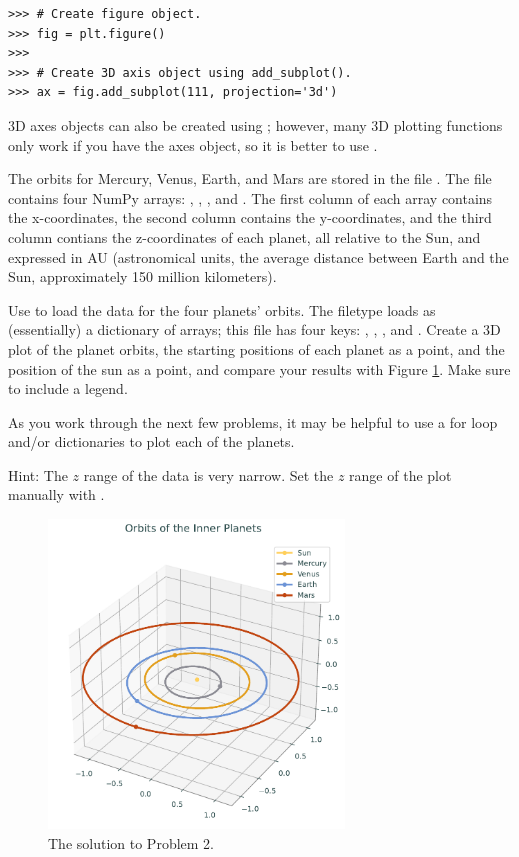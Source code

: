 \begin{lstlisting}
>>> # Create figure object.
>>> fig = plt.figure()
>>>
>>> # Create 3D axis object using add_subplot().
>>> ax = fig.add_subplot(111, projection='3d')
\end{lstlisting}

3D axes objects can also be created using ; however, many 3D plotting functions only work if you have the axes object, so it is better to use .

\begin{problem}
The orbits for Mercury, Venus, Earth, and Mars are stored in the file .
The file contains four NumPy arrays: , , , and .
The first column of each array contains the x-coordinates, the second column contains the y-coordinates, and the third column contians the z-coordinates of each planet, all relative to the Sun, and expressed in AU (astronomical units, the average distance between Earth and the Sun, approximately 150 million kilometers).

Use  to load the data for the four planets' orbits.
The  filetype loads as (essentially) a dictionary of arrays; this file has four keys: , , , and .
Create a 3D plot of the planet orbits, the starting positions of each planet as a point, and the position of the sun as a point, and compare your results with Figure \ref{lab0:3dplot}.
Make sure to include a legend.

As you work through the next few problems, it may be helpful to use a for loop and/or dictionaries to plot each of the planets.

Hint: The $z$ range of the data is very narrow. 
Set the $z$ range of the plot manually with .
\end{problem}

\begin{figure}[h]
\centering
\includegraphics[width=0.7\textwidth]{figures/orbits.pdf}
\caption{The solution to Problem 2.}
\label{lab0:3dplot}
\end{figure}

